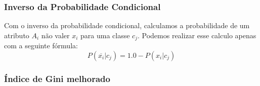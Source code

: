 \subsubsection{Inverso da Probabilidade Condicional}
\label{subsubsection::pc'}
Com o inverso da probabilidade condicional, calculamos a probabilidade de um atributo $A_i$ não valer $x_i$ para uma classe $c_j$. Podemos realizar esse calculo apenas com a seguinte fórmula:
\begin{equation}\label{eqn::plinhattalquec}
   P(\overline{x_i}|c_j) = 1.0 - P(x_i|c_j)
\end{equation}

\subsubsection{Índice de Gini melhorado}
\label{subsubsection::gini}

